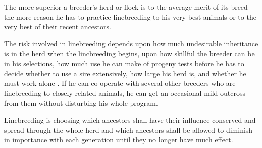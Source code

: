 The more superior a breeder's herd or flock is to the average merit
of its breed the more reason he has to practice linebreeding to his very
best animals or to the very best of their recent ancestors.

The risk involved in linebreeding depends upon how much undesirable
inheritance is in the herd when the lincbreeding begins, upon
how skillful the breeder can be in his selections, how much use he can
make of progeny tests before he has to decide whether to use a sire
extensively, how large his herd is, and whether he must work alone . If
he can co-operate with several other breeders who are linebreeding to
closely related animals, he can get an occasional mild outcross from
them without disturbing his whole program.

Linebreeding is choosing which ancestors shall have their influence
conserved and spread through the whole herd and which ancestors shall
be allowed to diminish in importance with each generation until they
no longer have much effect.
